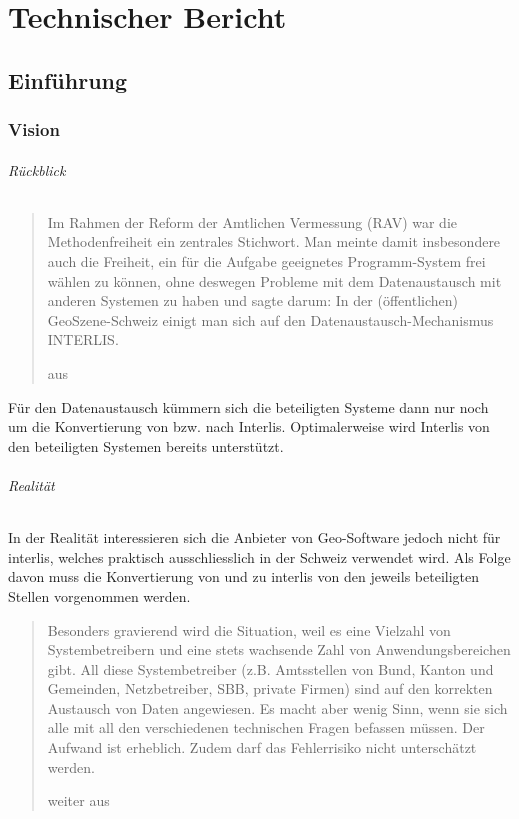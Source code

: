 \part{Technischer Bericht}\label{part:tb}
\glsresetall


\chapter{Einführung}

\section{Vision}\label{sec:tb:vision}
\paragraph{Rückblick}
\blockquote[aus \cite{rahmenvorst-interlisopen}]{Im Rahmen der Reform der Amtlichen Vermessung (RAV) war die Methodenfreiheit ein zentrales Stichwort. Man meinte damit insbesondere auch die Freiheit, ein für die Aufgabe geeignetes Programm-System frei wählen zu können, ohne deswegen Probleme mit dem Datenaustausch mit anderen Systemen zu haben und sagte darum: In der (öffentlichen) GeoSzene-Schweiz einigt man sich auf den Datenaustausch-Mechanismus INTERLIS.}

Für den Datenaustausch kümmern sich die beteiligten Systeme dann nur noch um die Konvertierung von bzw. nach Interlis. Optimalerweise wird Interlis von den beteiligten Systemen bereits unterstützt.

\paragraph{Realität}
In der Realität interessieren sich die Anbieter von Geo-Software jedoch nicht für \gls{interlis}, welches praktisch ausschliesslich in der Schweiz verwendet wird. Als Folge davon muss die Konvertierung von und zu \gls{interlis} von den jeweils beteiligten Stellen vorgenommen werden.

\blockquote[weiter aus \cite{rahmenvorst-interlisopen}]{Besonders gravierend wird die Situation, weil es eine Vielzahl von Systembetreibern und eine stets wachsende Zahl von Anwendungsbereichen gibt. All diese Systembetreiber (z.B. Amtsstellen von Bund, Kanton und Gemeinden, Netzbetreiber, SBB, private Firmen) sind auf den korrekten Austausch von Daten angewiesen. Es macht aber wenig Sinn, wenn sie sich alle mit all den verschiedenen technischen Fragen befassen müssen. Der Aufwand ist erheblich. Zudem darf das Fehlerrisiko nicht unterschätzt werden.}

